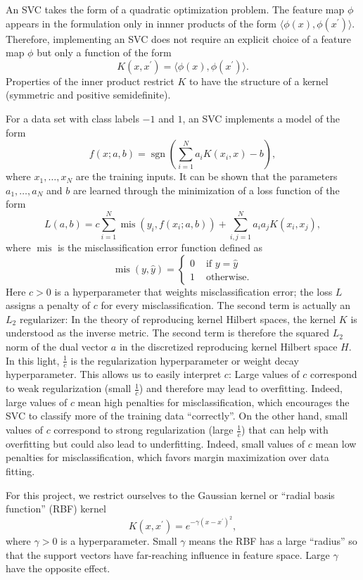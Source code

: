 \documentclass[12pt]{article}
\newcommand{\sgn}{\operatorname{sgn}}
\newcommand{\mis}{\operatorname{mis}}
\begin{document}
An SVC takes the form of a quadratic optimization problem. The feature map $\phi$ appears in the formulation only in innner products of the form $\langle \phi(x), \phi(x^\prime)\rangle$. Therefore, implementing an SVC does not require an explicit choice of a feature map $\phi$ but only a function of the form
\[ K(x, x^\prime) = \langle\phi(x), \phi(x^\prime)\rangle. \]
Properties of the inner product restrict $K$ to have the structure of a kernel (symmetric and positive semidefinite).

For a data set with class labels $-1$ and $1$, an SVC implements a model of the form
\[ f(x; a,b) = \sgn\left(\sum_{i=1}^N a_i K(x_i, x)-b\right), \]
where $x_1,\ldots,x_N$ are the training inputs. It can be shown that the parameters $a_1,\ldots,a_N$ and $b$ are learned through the minimization of a loss function of the form
\[ L(a, b) = c \sum_{i=1}^N \mis(y_i, f(x_i; a,b)) + \sum_{i,j=1}^N a_i a_j K(x_i, x_j), \]
where $\mis$ is the misclassification error function defined as
\[ \mis(y, \hat{y}) =
\begin{cases}
0 & \mbox{ if } y=\hat{y} \\
1 & \mbox{ otherwise.}
\end{cases} \]
Here $c>0$ is a hyperparameter that weights misclassification error; the loss $L$ assigns a penalty of $c$ for every misclassification. The second term is actually an $L_2$ regularizer: In the theory of reproducing kernel Hilbert spaces, the kernel $K$ is understood as the inverse metric. The second term is therefore the squared $L_2$ norm of the dual vector $a$ in the discretized reproducing kernel Hilbert space $H$. In this light, $\frac{1}{c}$ is the regularization hyperparameter or weight decay hyperparameter. This allows us to easily interpret $c$: Large values of $c$ correspond to weak regularization (small $\frac{1}{c}$) and therefore may lead to overfitting. Indeed, large values of $c$ mean high penalties for misclassification, which encourages the SVC to classify more of the training data ``correctly''. On the other hand, small values of $c$ correspond to strong regularization (large $\frac{1}{c}$) that can help with overfitting but could also lead to underfitting. Indeed, small values of $c$ mean low penalties for misclassification, which favors margin maximization over data fitting.

For this project, we restrict ourselves to the Gaussian kernel or ``radial basis function'' (RBF) kernel
\[ K(x, x^\prime) = e^{-\gamma(x-x^\prime)^2}, \]
where $\gamma>0$ is a hyperparameter. Small $\gamma$ means the RBF has a large ``radius'' so that the support vectors have far-reaching influence in feature space. Large $\gamma$ have the opposite effect.
\end{document}
